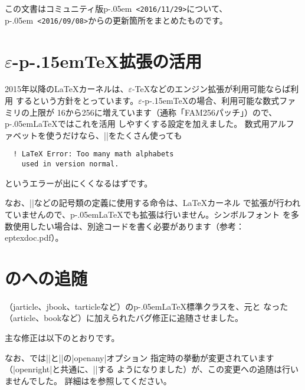 \documentclass{plnews}
\author{日本語\TeX{}開発コミュニティ（\texttt{https://texjp.org/}）}
\def\pTeX{p\kern-.15em\TeX}
\def\eTeX{$\varepsilon$-\TeX}
\def\epTeX{$\varepsilon$-\pTeX}
\def\pLaTeX{p\kern-.05em\LaTeX}
\def\pLaTeXe{p\kern-.05em\LaTeXe}
\begin{document}
\maketitle

この文書はコミュニティ版\pLaTeXe\ \texttt{<2016/11/29>}について、
\pLaTeXe\ \texttt{<2016/09/08>}からの更新箇所をまとめたものです。


\section{\epTeX{}拡張の活用}
2015年以降の\LaTeX{}カーネルは、\eTeX{}などのエンジン拡張が利用可能ならば利用
するという方針をとっています。\epTeX{}の場合、利用可能な数式ファミリの上限が
16から256に増えています（通称「FAM256パッチ」）ので、\pLaTeX{}ではこれを活用
しやすくする設定を加えました。
数式用アルファベットを使うだけなら、|\DeclareMathAlphabet|をたくさん使っても
\begin{verbatim}
  ! LaTeX Error: Too many math alphabets
    used in version normal.
\end{verbatim}
というエラーが出にくくなるはずです。

なお、|\DeclareMathSymbol|などの記号類の定義に使用する命令は、\LaTeX{}カーネル
で拡張が行われていませんので、\pLaTeX{}でも拡張は行いません。シンボルフォント
を多数使用したい場合は、別途コードを書く必要があります（参考：eptexdoc.pdf）。


\section{のへの追随}
（jarticle、jbook、tarticleなど）の\pLaTeX{}標準クラスを、元と
なった（article、bookなど）に加えられたバグ修正に追随させました。

主な修正は以下のとおりです。
なお、では|\frontmatter|と|\mainmatter|の|openany|オプション
指定時の挙動が変更されています（|openright|と共通に、|\cleardoublepage|する
ようになりました）が、この変更への追随は行いませんでした。
詳細はを参照してください。
\end{document}
